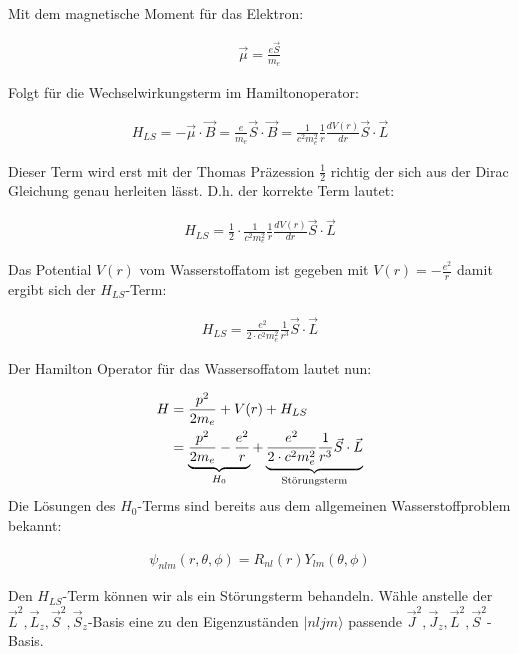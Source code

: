 Mit dem magnetische Moment für das Elektron:

\begin{align}
  \label{eq:4}
  \vec \mu = \frac{e\vec S}{m_e}
\end{align}

Folgt für die Wechselwirkungsterm im Hamiltonoperator:

\begin{align}
  \label{eq:5}
  H_{LS} = -\vec\mu\cdot\vec B = \frac{e}{m_e}\vec S\cdot\vec B =  \frac{1}{c^2 m_e^2}\frac{1}{r} \frac{dV(r)}{dr}\vec S\cdot \vec L
\end{align}

Dieser Term wird erst mit der Thomas Präzession \(\frac{1}{2}\) richtig der sich aus der Dirac Gleichung genau herleiten lässt. D.h. der korrekte Term lautet:

\begin{align}
  \label{eq:6}
  \boxed{H_{LS} = \frac{1}{2}\cdot\frac{1}{c^2 m_e^2}\frac{1}{r} \frac{dV(r)}{dr}\vec S\cdot \vec L}
\end{align}

Das Potential \(V(r)\) vom Wasserstoffatom ist gegeben mit \(V(r) = - \frac{e^2}{r}\) damit ergibt sich der \(H_{LS}\)-Term:

\begin{align}
  \label{eq:7}
  H_{LS} =  \frac{e^2}{2\cdot c^2 m_e^2}\frac{1}{r^3} \vec S\cdot \vec L
\end{align}

Der Hamilton Operator für das Wassersoffatom lautet nun:

\begin{align}
  \label{eq:8}
  H &= \frac{p^2}{2m_e} + V(r) + H_{LS}\notag \\
&= \underbrace{\frac{p^2}{2m_e} -\frac{e^2}{r}}_{H_0} + \underbrace{\frac{e^2}{2\cdot c^2 m_e^2}\frac{1}{r^3} \vec S\cdot \vec L}_{\text{Störungsterm}}
\end{align}
Die Lösungen des \(H_0\)-Terms sind bereits aus dem allgemeinen Wasserstoffproblem bekannt:

\begin{align}
  \label{eq:9}
  \psi_{nlm}(r,\theta,\phi) = R_{nl}(r)Y_{lm}(\theta,\phi)
\end{align}

Den \(H_{LS}\)-Term können wir als ein Störungsterm behandeln. Wähle anstelle der \(\vec L^2,\vec L_z,\vec S^2,\vec S_z\)-Basis eine zu den Eigenzuständen \(|nljm\rangle \)  passende \(\vec J^2,\vec J_z,\vec L^2,\vec S^2\)-Basis. 


